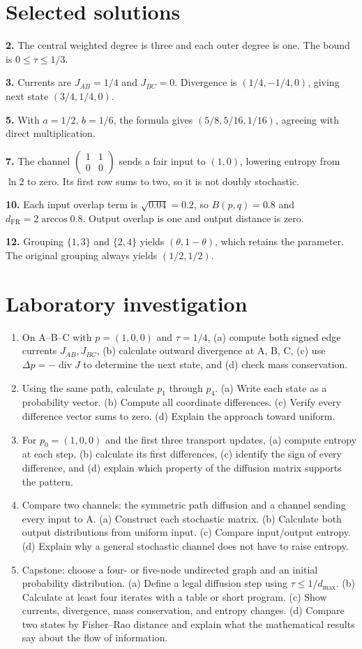\documentclass[11pt,oneside,openany]{book}
\theoremstyle{definition}
\theoremstyle{remark}
\numberwithin{equation}{chapter}
\providecommand{\tightlist}{\setlength{\itemsep}{0pt}\setlength{\parskip}{0pt}}
\newcommand{\labheading}{\FloatBarrier\section*{Laboratory investigation}\addcontentsline{toc}{section}{Laboratory investigation}}
\begin{document}
\section{Selected solutions}\label{ch10-selected-solutions}

\textbf{2.} The central weighted degree is three and each outer degree is one. The bound is \(0\leq\tau\leq1/3\).

\textbf{3.} Currents are \(J_{AB}=1/4\) and \(J_{BC}=0\). Divergence is \((1/4,-1/4,0)\), giving next state \((3/4,1/4,0)\).

\textbf{5.} With \(a=1/2\), \(b=1/6\), the formula gives \((5/8,5/16,1/16)\), agreeing with direct multiplication.

\textbf{7.} The channel \(\left(\begin{smallmatrix}1&1\\0&0\end{smallmatrix}\right)\) sends a fair input to \((1,0)\), lowering entropy from \(\ln2\) to zero. Its first row sums to two, so it is not doubly stochastic.

\textbf{10.} Each input overlap term is \(\sqrt{0.04}=0.2\), so \(B(p,q)=0.8\) and \(d_{\mathrm{FR}}=2\arccos0.8\). Output overlap is one and output distance is zero.

\textbf{12.} Grouping \(\{1,3\}\) and \(\{2,4\}\) yields \((\theta,1-\theta)\), which retains the parameter. The original grouping always yields \((1/2,1/2)\).
\labheading\begin{enumerate}
\def\labelenumi{\arabic{enumi}.}
\tightlist
\item
  On A--B--C with \(p=(1,0,0)\) and \(\tau=1/4\), (a) compute both signed edge currents \(J_{AB},J_{BC}\), (b) calculate outward divergence at A, B, C, (c) use \(\Delta p=-\operatorname{div}J\) to determine the next state, and (d) check mass conservation.
\item
  Using the same path, calculate \(p_1\) through \(p_4\). (a) Write each state as a probability vector. (b) Compute all coordinate differences. (c) Verify every difference vector sums to zero. (d) Explain the approach toward uniform.
\item
  For \(p_0=(1,0,0)\) and the first three transport updates, (a) compute entropy at each step, (b) calculate its first differences, (c) identify the sign of every difference, and (d) explain which property of the diffusion matrix supports the pattern.
\item
  Compare two channels: the symmetric path diffusion and a channel sending every input to A. (a) Construct each stochastic matrix. (b) Calculate both output distributions from uniform input. (c) Compare input/output entropy. (d) Explain why a general stochastic channel does not have to raise entropy.
\item
  Capstone: choose a four- or five-node undirected graph and an initial probability distribution. (a) Define a legal diffusion step using \(\tau\leq1/d_{\max}\). (b) Calculate at least four iterates with a table or short program. (c) Show currents, divergence, mass conservation, and entropy changes. (d) Compare two states by Fisher--Rao distance and explain what the mathematical results say about the flow of information.
\end{enumerate}
\end{document}
